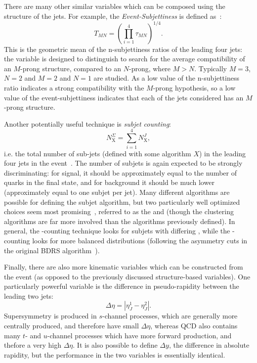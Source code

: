There are many other similar variables which can be composed using the structure of the \largeR jets. For example, the \textit{Event-Subjettiness} is defined as~\cite{Cohen:2012yc}:
%
\begin{equation}
T_{MN} = \left(\prod_{i=1}^4 \tau_{MN}\right)^{1/4}.
\end{equation}
%
This is the geometric mean of the n-subjettiness ratios of the leading four jets: the variable is designed to distinguish to search for the average compatibility of an $M$-prong structure, compared to an $N$-prong, where $M>N$. Typically $M=3$, $N=2$ and $M=2$ and $N=1$ are studied. As a low value of the n-subjettiness ratio indicates a strong compatibility with the $M$-prong hypothesis, so a low value of the event-subjettiness indicates that each of the jets considered has an $M$-prong structure.

Another potentially useful technique is \textit{subjet counting}:
%
\begin{equation}
N_\mathrm{X}^\Sigma = \sum_{i=1}^4 N_\mathrm{X}^J,
\end{equation}
%
i.e. the total number of sub-jets (defined with some algorithm $X$) in the leading four jets in the event~\cite{SubjetCounting}. The number of subjets is again expected to be strongly discriminating: for signal, it should be approximately equal to the number of quarks in the final state, and for background it should be much lower (approximately equal to one subjet per jet). Many different algorithms are possible for defining the subjet algorithm, but two particularly well optimized choices seem most promising~\cite{SubjetCounting}, referred to as the \kt and \ca (though the clustering algorithms are far more involved than the algorithms previously defined). In general, the \kt-counting technique looks for subjets with differing \pt, while the \ca-counting looks for more balanced \pt distributions (following the asymmetry cuts in the original BDRS algorithm~\cite{BDRS}). 

Finally, there are also more kinematic variables which can be constructed from the event (as opposed to the previously discussed structure-based variables). One particularly powerful variable is the difference in pseudo-rapidity between the leading two jets:
%
\begin{equation}
\Delta \eta = |\eta_J^1 - \eta_J^2|.
\end{equation}
%
Supersymmetry is produced in $s$-channel processes, which are generally more centrally produced, and therefore have small $\Delta\eta$, whereas QCD also contains many $t$- and $u$-channel processes which have more forward production, and thefore a very high $\Delta\eta$. It is also possible to define $\Delta y$, the difference in absolute rapidity, but the performance in the two variables is essentially identical.

